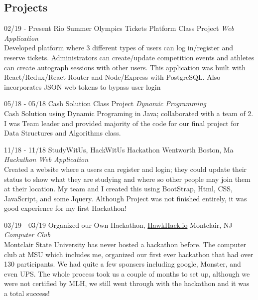 \documentclass[]{friggeri-cv}
\begin{document}
\subsection{Projects}

\begin{entrylist}


\entry
{02/19 - Present }
{ Rio Summer Olympics Tickets Platform}
{Class Project}
{\emph{Web Application} \\
Developed platform where 3 different types of users can log in/register and reserve tickets. Administrators can create/update competition events and athletes can create autograph sessions with other users. This application was built with React/Redux/React Router and Node/Express with PostgreSQL. Also incorporates JSON web tokens to bypass user login  }

\entry
{05/18 - 05/18}
{Cash Solution}
{Class Project}
{\emph{Dynamic Programming} \\
Cash Solution using Dynamic Programing in Java; collaborated with a team of 2. I was Team leader and provided majority of the code for our final project for Data Structures and Algorithms class.}

\entry
{11/18 - 11/18}
{StudyWitUs, HackWitUs Hackathon}
{Wentworth Boston, Ma}
{\emph{Hackathon Web Application} \\
Created a website where a users can register and login; they could update their status to show what they are studying and where so other people may join them at their location. My team and I created this using BootStrap, Html, CSS, JavaScript, and some Jquery. Although Project was not finished entirely, it was good experience for my first Hackathon! }

\entry
{03/19 - 03/19}
{Organized our Own Hackathon, \href {http://hawkhack.io}{HawkHack.io}}
{Montclair, NJ}
{\emph{Computer Club} \\
Montclair State University has never hosted a hackathon before. The computer club at MSU which includes me, organized our first ever hackathon that had over 130 participants. We had quite a few sponsers including google, Monster, and even UPS. The whole process took us a couple of months to set up, although we were not certified by MLH, we still went through with the hackathon and it was a total success!}

\end{entrylist}
\end{document}
